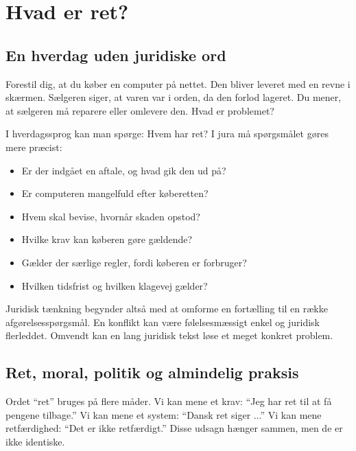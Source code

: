 \chapter{Hvad er ret?}


\section{En hverdag uden juridiske ord}

Forestil dig, at du køber en computer på nettet. Den bliver leveret med en revne i skærmen. Sælgeren siger, at varen var i orden, da den forlod lageret. Du mener, at sælgeren må reparere eller omlevere den. Hvad er problemet?

I hverdagssprog kan man spørge: Hvem har ret? I jura må spørgsmålet gøres mere præcist:

\begin{itemize}
  \item Er der indgået en aftale, og hvad gik den ud på?
  \item Er computeren mangelfuld efter køberetten?
  \item Hvem skal bevise, hvornår skaden opstod?
  \item Hvilke krav kan køberen gøre gældende?
  \item Gælder der særlige regler, fordi køberen er forbruger?
  \item Hvilken tidsfrist og hvilken klagevej gælder?
\end{itemize}

Juridisk tænkning begynder altså med at omforme en fortælling til en række afgørelsesspørgsmål. En konflikt kan være følelsesmæssigt enkel og juridisk flerleddet. Omvendt kan en lang juridisk tekst løse et meget konkret problem.

\section{Ret, moral, politik og almindelig praksis}

Ordet ``ret'' bruges på flere måder. Vi kan mene et krav: ``Jeg har ret til at få pengene tilbage.'' Vi kan mene et system: ``Dansk ret siger ...'' Vi kan mene retfærdighed: ``Det er ikke retfærdigt.'' Disse udsagn hænger sammen, men de er ikke identiske.

